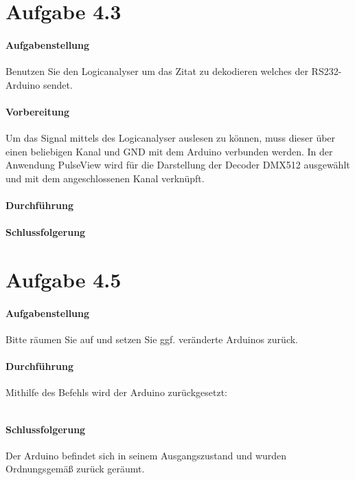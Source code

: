 \section{Aufgabe 4.3}
\paragraph{Aufgabenstellung}
Benutzen Sie den Logicanalyser um das Zitat zu dekodieren welches der RS232-Arduino sendet.

\paragraph{Vorbereitung}
Um das Signal mittels des Logicanalyser auslesen zu können, muss dieser über einen beliebigen Kanal und GND mit dem Arduino verbunden werden. In der Anwendung PulseView wird für die Darstellung der Decoder DMX512 ausgewählt und mit dem angeschlossenen Kanal verknüpft.

\paragraph{Durchführung}


\paragraph{Schlussfolgerung}








\section{Aufgabe 4.5}
\paragraph{Aufgabenstellung}
Bitte räumen Sie auf und setzen Sie ggf. veränderte Arduinos zurück.

\paragraph{Durchführung}
Mithilfe des Befehls wird der Arduino zurückgesetzt:

\inputminted[breaklines, fontsize=\fontsize{10pt}{10pt}]{bash}{../docs/reset-dmx.txt}

\paragraph{Schlussfolgerung}
Der Arduino befindet sich in seinem Ausgangszustand und wurden Ordnungsgemäß zurück geräumt.